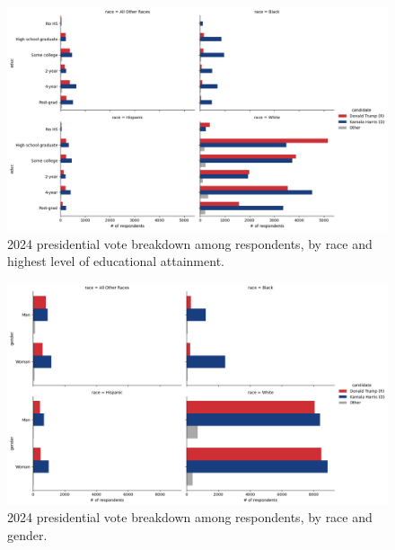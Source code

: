 \documentclass[letter]{article}
\begin{document}
\begin{figure}[H]
\centering
\includegraphics[scale=0.45]{eda/ces24-race_educ.png}
\caption{2024 presidential vote breakdown among respondents, by race and highest level of educational attainment.}
\end{figure}
\begin{figure}[H]
\centering
\includegraphics[scale=0.4]{eda/ces24-race_gender.png}
\caption{2024 presidential vote breakdown among respondents, by race and gender.}
\end{figure}
\end{document}
